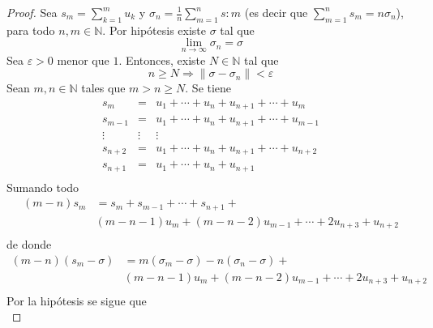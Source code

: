 \documentclass[12pt]{report}
\theoremstyle{largebreak}
\newcommand\norm[1]{\ensuremath{\|#1\|}}
\begin{document}
    \begin{proof}
        Sea $s_m=\sum_{ k=1}^m u_k$ y $\sigma_n=\frac{1}{n}\sum_{ m=1}^n s:m$ (es decir que $\sum_{ m=1}^n s_m=n\sigma_n$), para todo $n,m\in\mathbb{N}$. Por hipótesis existe $\sigma$ tal que
        \begin{equation*}
            \lim_{ n\rightarrow\infty}\sigma_n=\sigma
        \end{equation*}
        Sea $\varepsilon>0$ menor que $1$. Entonces, existe $N\in\mathbb{N}$ tal que
        \begin{equation*}
            n\geq N\Rightarrow\norm{\sigma-\sigma_n}<\varepsilon
        \end{equation*}
        Sean $m,n\in\mathbb{N}$ tales que $m>n\geq N$. Se tiene
        \begin{equation*}
            \begin{array}{ccc}
                s_m&=&u_1+\cdots+u_n+u_{ n+1}+\cdots+u_m\\
                s_{ m-1}&=&u_1+\cdots+u_n+u_{ n+1}+\cdots+u_{ m-1}\\
                \vdots & \vdots & \vdots \\
                s_{ n+2}&=&u_1+\cdots+u_n+u_{ n+1}+\cdots+u_{ n+2}\\
                s_{ n+1}&=&u_1+\cdots+u_n+u_{ n+1}\\
            \end{array}
        \end{equation*}
        Sumando todo
        \begin{equation*}
            \begin{split}
                (m-n)s_m&=s_m+s_{ m-1}+\cdots+s_{ n+1}+\\
                &(m-n-1)u_m+(m-n-2)u_{ m-1}+\cdots+2u_{ n+3}+u_{ n+2}\\
            \end{split}
        \end{equation*}
        de donde
        \begin{equation*}
            \begin{split}
                (m-n)(s_m-\sigma)&=m(\sigma_m-\sigma)-n(\sigma_n-\sigma)+\\
                &(m-n-1)u_m+(m-n-2)u_{ m-1}+\cdots+2u_{ n+3}+u_{ n+2}\\
            \end{split}
        \end{equation*}
        Por la hipótesis se sigue que
        \begin{equation*}

\end{equation*}
\end{proof}
\end{document}
